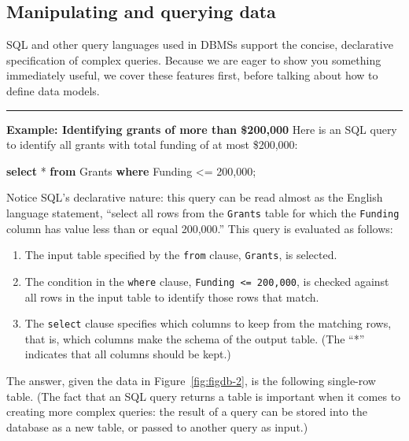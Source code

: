 \documentclass[]{krantz}
\newenvironment{Shaded}{\begin{snugshade}}{\end{snugshade}}
\newcommand{\KeywordTok}[1]{\textcolor[rgb]{0.13,0.29,0.53}{\textbf{#1}}}
\newcommand{\DecValTok}[1]{\textcolor[rgb]{0.00,0.00,0.81}{#1}}
\newcommand{\NormalTok}[1]{#1}
\begin{document}
\hypertarget{sec:db:sql}{\subsection{Manipulating and querying
data}\label{sec:db:sql}}

SQL and other query languages used in DBMSs support the concise,
declarative specification of complex queries. Because we are eager to
show you something immediately useful, we cover these features first,
before talking about how to define data models.

\begin{center}\rule{0.5\linewidth}{\linethickness}\end{center}

\textbf{Example: Identifying grants of more than \$200,000} Here is an
SQL query to identify all grants with total funding of at most
\$200,000:

\begin{Shaded}
\begin{Highlighting}[]
\KeywordTok{select}\NormalTok{ * }\KeywordTok{from}\NormalTok{ Grants}
\KeywordTok{where}\NormalTok{ Funding <= }\DecValTok{200}\NormalTok{,}\DecValTok{000}\NormalTok{;}
\end{Highlighting}
\end{Shaded}

Notice SQL's declarative nature: this query can be read almost as the
English language statement, ``select all rows from the \texttt{Grants}
table for which the \texttt{Funding} column has value less than or equal
200,000.'' This query is evaluated as follows:

\begin{enumerate}
\def\labelenumi{\arabic{enumi}.}
\item
  The input table specified by the \texttt{from} clause,
  \texttt{Grants}, is selected.
\item
  The condition in the \texttt{where} clause,
  \texttt{Funding\ \textless{}=\ 200,000}, is checked against all rows
  in the input table to identify those rows that match.
\item
  The \texttt{select} clause specifies which columns to keep from the
  matching rows, that is, which columns make the schema of the output
  table. (The ``*'' indicates that all columns should be kept.)
\end{enumerate}

The answer, given the data in Figure~\ref{fig:figdb-2}, is the following
single-row table. (The fact that an SQL query returns a table is
important when it comes to creating more complex queries: the result of
a query can be stored into the database as a new table, or passed to
another query as input.)
\end{document}
